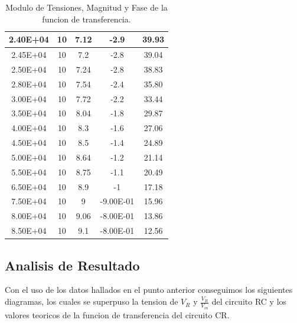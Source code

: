 \begin{table}[!htb]
\begin{tabular}{|c|c|c|c|c|}
2.40E+04  & 10    & 7.12     & -2.9            & 39.93         \\ \hline
2.45E+04  & 10    & 7.2      & -2.8            & 39.04         \\ \hline
2.50E+04  & 10    & 7.24     & -2.8            & 38.83         \\ \hline
2.80E+04  & 10    & 7.54     & -2.4            & 35.80         \\ \hline
3.00E+04  & 10    & 7.72     & -2.2            & 33.44         \\ \hline
3.50E+04  & 10    & 8.04     & -1.8            & 29.87         \\ \hline
4.00E+04  & 10    & 8.3      & -1.6            & 27.06         \\ \hline
4.50E+04  & 10    & 8.5      & -1.4            & 24.89         \\ \hline
5.00E+04  & 10    & 8.64     & -1.2            & 21.14         \\ \hline
5.50E+04  & 10    & 8.75     & -1.1            & 20.49         \\ \hline
6.50E+04  & 10    & 8.9      & -1              & 17.18         \\ \hline
7.50E+04  & 10    & 9        & -9.00E-01       & 15.96         \\ \hline
8.00E+04  & 10    & 9.06     & -8.00E-01       & 13.86         \\ \hline
8.50E+04  & 10    & 9.1      & -8.00E-01       & 12.56         \\ \hline
\end{tabular}
\caption{Modulo de Tensiones, Magnitud y Fase de la funcion de transferencia.}
\end{table}

\subsection{Analisis de Resultado}

Con el uso de los datos hallados en el punto anterior conseguimos los siguientes diagramas, los cuales se superpuso la tension de $V_R$ y $\frac{V_R}{V_{in}}$ del circuito RC y los valores teoricos de la funcion de transferencia del circuito CR. 

